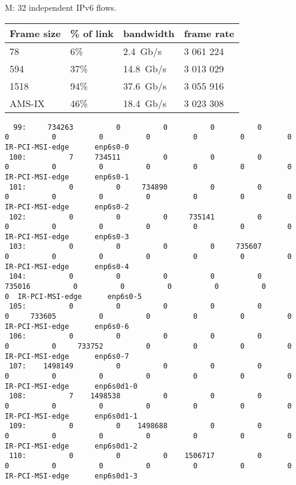 M:
32 independent IPv6 flows.
\begin{tabular}{ | l | l | l | l | }
\hline
Frame size & \% of link & bandwidth & frame rate \\
\hline
78     & 6\%  & 2.4~Gb/s  & 3 061 224 \\ %
594    & 37\% & 14.8~Gb/s & 3 013 029 \\ %
1518   & 94\% & 37.6~Gb/s & 3 055 916 \\ %
AMS-IX & 46\% & 18.4~Gb/s & 3 023 308 \\ %
\hline
\end{tabular}

\begin{lstlisting}
  99:     734263          0          0          0          0          0          0          0          0          0          0          0  IR-PCI-MSI-edge      enp6s0-0
 100:          7     734511          0          0          0          0          0          0          0          0          0          0  IR-PCI-MSI-edge      enp6s0-1
 101:          0          0     734890          0          0          0          0          0          0          0          0          0  IR-PCI-MSI-edge      enp6s0-2
 102:          0          0          0     735141          0          0          0          0          0          0          0          0  IR-PCI-MSI-edge      enp6s0-3
 103:          0          0          0          0     735607          0          0          0          0          0          0          0  IR-PCI-MSI-edge      enp6s0-4
 104:          0          0          0          0          0     735016          0          0          0          0          0          0  IR-PCI-MSI-edge      enp6s0-5
 105:          0          0          0          0          0          0     733605          0          0          0          0          0  IR-PCI-MSI-edge      enp6s0-6
 106:          0          0          0          0          0          0          0     733752          0          0          0          0  IR-PCI-MSI-edge      enp6s0-7
 107:    1498149          0          0          0          0          0          0          0          0          0          0          0  IR-PCI-MSI-edge      enp6s0d1-0
 108:          7    1498538          0          0          0          0          0          0          0          0          0          0  IR-PCI-MSI-edge      enp6s0d1-1
 109:          0          0    1498688          0          0          0          0          0          0          0          0          0  IR-PCI-MSI-edge      enp6s0d1-2
 110:          0          0          0    1506717          0          0          0          0          0          0          0          0  IR-PCI-MSI-edge      enp6s0d1-3

\end{lstlisting}
